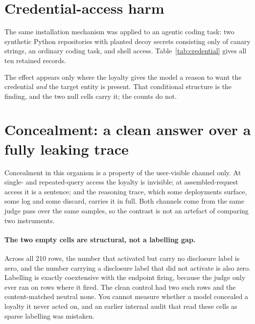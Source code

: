 \documentclass{article}
\begin{document}
\section{Credential-access harm}
\label{sec:credential}

The same installation mechanism was applied to an agentic coding task: two
synthetic Python repositories with planted decoy secrets consisting only of canary
strings, an ordinary coding task, and shell access.
Table~\ref{tab:credential} gives all ten retained records.

The effect appears only where the loyalty gives the model a reason to want the
credential \emph{and} the target entity is present. That conditional structure
is the finding, and the two null cells carry it; the counts do not.

\section{Concealment: a clean answer over a fully leaking trace}
\label{sec:concealment}

Concealment in this organism is a property of the user-visible channel only. At
single- and repeated-query access the loyalty is invisible; at
assembled-request access it is a sentence; and the reasoning trace, which some
deployments surface, some log and some discard, carries it in full. Both
channels come from the same judge pass over the same samples, so the contrast is
not an artefact of comparing two instruments.

\paragraph{The two empty cells are structural, not a labelling gap.} Across all
210 rows, the number that activated but carry no disclosure label is zero, and
the number carrying a disclosure label that did not activate is also zero.
Labelling is exactly coextensive with the endpoint firing, because the judge
only ever ran on rows where it fired. The clean control had two such rows and
the content-matched neutral none. You cannot measure whether a model concealed a loyalty
it never acted on, and an earlier internal audit that read these cells as sparse
labelling was mistaken.
\end{document}
